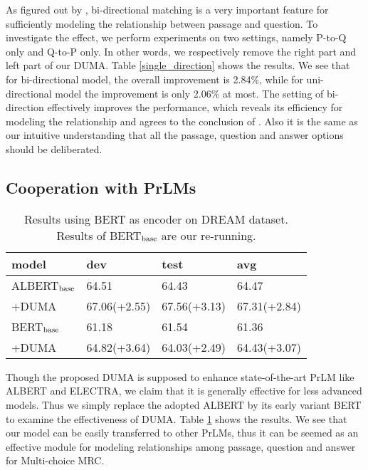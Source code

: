 \documentclass[letterpaper]{article} \usepackage{aaai21}  \usepackage{times}  \usepackage{helvet} \usepackage{courier}  \usepackage[hyphens]{url}  \usepackage{graphicx} \urlstyle{rm} \def\UrlFont{\rm}  \usepackage{natbib}  \usepackage{caption} \frenchspacing  \setlength{\pdfpagewidth}{8.5in}  \setlength{\pdfpageheight}{11in}
\begin{document}
As figured out by \cite{dcmn}, bi-directional matching is a very important feature for sufficiently modeling the relationship between passage and question. To investigate the effect, we perform experiments on two settings, namely P-to-Q only and Q-to-P only. In other words, we respectively remove the right part and left part of our DUMA. Table \ref{single_direction} shows the results. We see that for bi-directional model, the overall improvement is 2.84\%, while for uni-directional model the improvement is only 2.06\% at most. The setting of bi-direction effectively improves the performance, which reveals its efficiency for modeling the relationship and agrees to the conclusion of \cite{dcmn}. Also it is the same as our intuitive understanding that all the passage, question and answer options should be deliberated.

\subsection{Cooperation with PrLMs} \label{with_bert}
\begin{table}[t]\small
\renewcommand\arraystretch{1.2}
	\centering
	{
		\begin{tabular}{p{1.6cm}|p{1.6cm}|p{1.6cm}|p{1.6cm}}
			\hline		
			 model & dev & test &avg \\
			\hline
			\hline
			ALBERT$_{\rm base}$ & 64.51 & 64.43 &64.47 \\
			\;\;+DUMA &  67.06\;(+2.55) & 67.56\;(+3.13) & 67.31\;(+2.84)\\
			\hline
			BERT$_{\rm base}$ & 61.18  &  61.54 & 61.36 \\
			\;\;+DUMA & 64.82\;(+3.64) & 64.03\;(+2.49) & 64.43\;(+3.07) \\
			\hline
		\end{tabular}
		
	}
	\caption{\label{bert_result} Results using BERT as encoder on DREAM dataset. Results of BERT$_{\rm base}$ are our re-running.}
\end{table}

Though the proposed DUMA is supposed to enhance state-of-the-art PrLM like ALBERT and ELECTRA, we claim that it is generally effective for less advanced models. Thus we simply replace the adopted ALBERT by its early variant BERT to examine the effectiveness of DUMA. Table \ref{bert_result} shows the results. We see that our model can be easily transferred to other PrLMs, thus it can be seemed as an effective module for modeling relationships among passage, question and answer for Multi-choice MRC.
\end{document}

